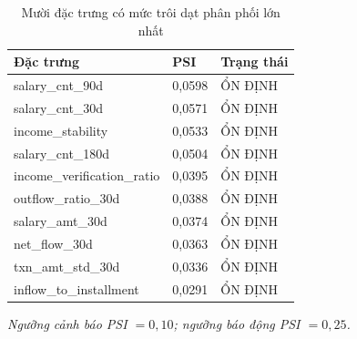 \begin{table}[!htbp]
\centering
\caption{Mười đặc trưng có mức trôi dạt phân phối lớn nhất}
\label{tab:drift}
\small
\setlength{\tabcolsep}{5.0pt}
\begin{tabular}{@{}L{6.4cm}R{2.6cm}L{4.4cm}@{}}
\toprule
\textbf{Đặc trưng} & \textbf{PSI} & \textbf{Trạng thái} \\
\midrule
salary\_\allowbreak cnt\_\allowbreak 90d & 0,0598 & ỔN ĐỊNH \\
salary\_\allowbreak cnt\_\allowbreak 30d & 0,0571 & ỔN ĐỊNH \\
income\_\allowbreak stability & 0,0533 & ỔN ĐỊNH \\
salary\_\allowbreak cnt\_\allowbreak 180d & 0,0504 & ỔN ĐỊNH \\
income\_\allowbreak verification\_\allowbreak ratio & 0,0395 & ỔN ĐỊNH \\
outflow\_\allowbreak ratio\_\allowbreak 30d & 0,0388 & ỔN ĐỊNH \\
salary\_\allowbreak amt\_\allowbreak 30d & 0,0374 & ỔN ĐỊNH \\
net\_\allowbreak flow\_\allowbreak 30d & 0,0363 & ỔN ĐỊNH \\
txn\_\allowbreak amt\_\allowbreak std\_\allowbreak 30d & 0,0336 & ỔN ĐỊNH \\
inflow\_\allowbreak to\_\allowbreak installment & 0,0291 & ỔN ĐỊNH \\
\bottomrule
\end{tabular}

\vspace{2pt}
{\footnotesize\itshape Ngưỡng cảnh báo PSI $= 0{,}10$; ngưỡng báo động PSI $= 0{,}25$.}
\end{table}
